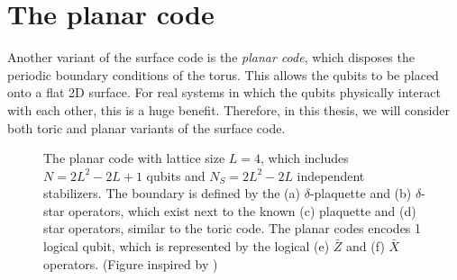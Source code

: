 \section{The planar code}\label{sec:surface_planar}

Another variant of the surface code is the \emph{planar code}, which disposes the periodic boundary conditions of the torus. This allows the qubits to be placed onto a flat 2D surface. For real systems in which the qubits physically interact with each other, this is a huge benefit. Therefore, in this thesis, we will consider both toric and planar variants of the surface code.

\def\QS{15}
\def\s{1.5}

\begin{figure}
  \centering
  \caption{The planar code with lattice size $L=4$, which includes $N = 2L^2-2L+1$ qubits and $N_S = 2L^2-2L$ independent stabilizers. The boundary is defined by the (a) $\delta$-plaquette and (b) $\delta$-star operators, which exist next to the known (c) plaquette and (d) star operators, similar to the toric code. The planar codes encodes 1 logical qubit, which is represented by the logical (e) $\bar{Z}$ and (f) $\bar{X}$ operators. (Figure inspired by \cite{browne})}\label{sf:fig_planar}
\end{figure}

